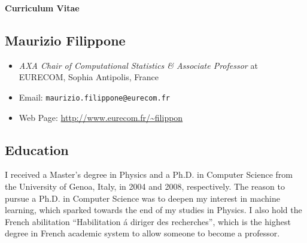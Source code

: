 \documentclass[a4paper,10pt]{article}
\begin{document}
\begin{center}
{\bf \LARGE Curriculum Vitae}
\end{center}


\subsection*{Maurizio Filippone}
\begin{itemize}
\item {\em AXA Chair of Computational Statistics \& Associate Professor} at EURECOM, Sophia Antipolis, France
\item Email:              \texttt{maurizio.filippone@eurecom.fr}
\item Web Page:           \url{http://www.eurecom.fr/~filippon}
\end{itemize}



\subsection*{Education}

I received a Master's degree in Physics and a Ph.D. in Computer Science from the University of Genoa, Italy, in 2004 and 2008, respectively.
The reason to pursue a Ph.D. in Computer Science was to deepen my interest in machine learning, which sparked towards the end of my studies in Physics.
I also hold the French abilitation ``Habilitation \'a diriger des recherches'', which is the highest degree in French academic system to allow someone to become a professor.


\end{document}
